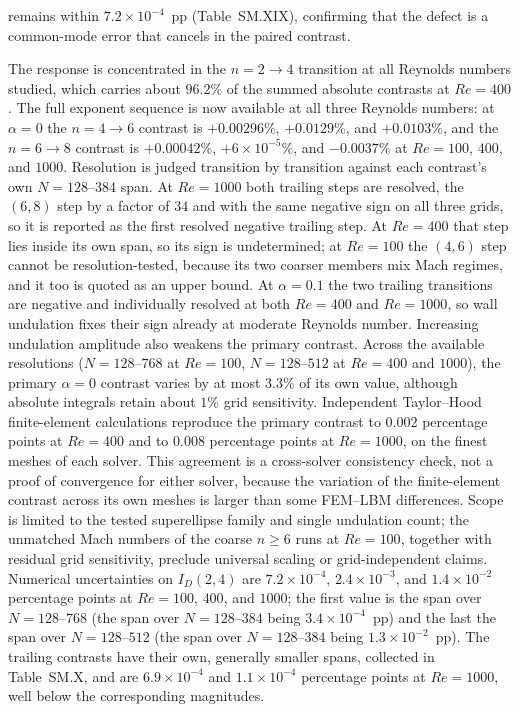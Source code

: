 remains within $7.2\times10^{-4}$~pp (Table~SM.XIX), confirming that the defect is a common-mode error that cancels in the paired contrast.

The response is concentrated in the $n=2\to4$ transition at all Reynolds numbers studied, which carries about $96.2\%$ of the summed absolute contrasts at $Re=400$. The full exponent sequence is now available at all three Reynolds numbers: at $\alpha=0$ the $n=4\to6$ contrast is $+0.00296\%$, $+0.0129\%$, and $+0.0103\%$, and the $n=6\to8$ contrast is $+0.00042\%$, $+6\times10^{-5}\%$, and $-0.0037\%$ at $Re=100$, $400$, and $1000$. Resolution is judged transition by transition against each contrast's own $N=128$--$384$ span. At $Re=1000$ both trailing steps are resolved, the $(6,8)$ step by a factor of $34$ and with the same negative sign on all three grids, so it is reported as the first resolved negative trailing step. At $Re=400$ that step lies inside its own span, so its sign is undetermined; at $Re=100$ the $(4,6)$ step cannot be resolution-tested, because its two coarser members mix Mach regimes, and it too is quoted as an upper bound. At $\alpha=0.1$ the two trailing transitions are negative and individually resolved at both $Re=400$ and $Re=1000$, so wall undulation fixes their sign already at moderate Reynolds number. Increasing undulation amplitude also weakens the primary contrast. Across the available resolutions ($N=128$--$768$ at $Re=100$, $N=128$--$512$ at $Re=400$ and $1000$), the primary $\alpha=0$ contrast varies by at most $3.3\%$ of its own value, although absolute integrals retain about $1\%$ grid sensitivity. Independent Taylor--Hood finite-element calculations reproduce the primary contrast to $0.002$ percentage points at $Re=400$ and to $0.008$ percentage points at $Re=1000$, on the finest meshes of each solver. This agreement is a cross-solver consistency check, not a proof of convergence for either solver, because the variation of the finite-element contrast across its own meshes is larger than some FEM--LBM differences. Scope is limited to the tested superellipse family and single undulation count; the unmatched Mach numbers of the coarse $n\ge6$ runs at $Re=100$, together with residual grid sensitivity, preclude universal scaling or grid-independent claims. Numerical uncertainties on $I_D(2,4)$ are $7.2\times10^{-4}$, $2.4\times10^{-3}$, and $1.4\times10^{-2}$ percentage points at $Re=100$, $400$, and $1000$; the first value is the span over $N=128$--$768$ (the span over $N=128$--$384$ being $3.4\times10^{-4}$~pp) and the last the span over $N=128$--$512$ (the span over $N=128$--$384$ being $1.3\times10^{-2}$~pp). The trailing contrasts have their own, generally smaller spans, collected in Table~SM.X, and are $6.9\times10^{-4}$ and $1.1\times10^{-4}$ percentage points at $Re=1000$, well below the corresponding magnitudes.

